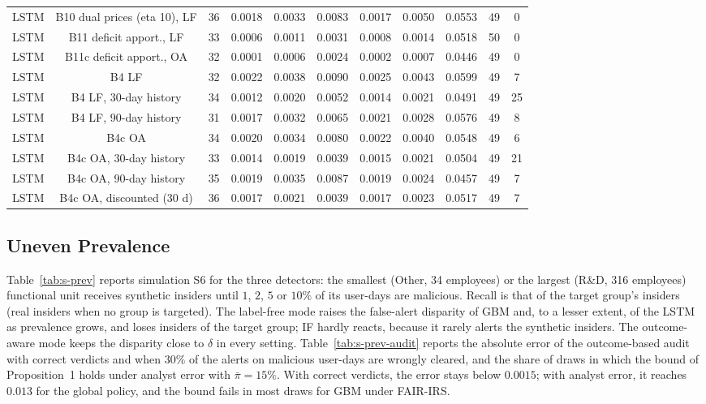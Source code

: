 \documentclass[10pt,onecolumn,letterpaper]{article}
\begin{document}
\begin{table}[!t]
{\begin{tabular}{lcccccccccc}
LSTM & B10 dual prices (eta 10), LF & 36 & 0.0018 & 0.0033 & 0.0083 & 0.0017 & 0.0050 & 0.0553 & 49 & 0 \\
LSTM & B11 deficit apport., LF & 33 & 0.0006 & 0.0011 & 0.0031 & 0.0008 & 0.0014 & 0.0518 & 50 & 0 \\
LSTM & B11c deficit apport., OA & 32 & 0.0001 & 0.0006 & 0.0024 & 0.0002 & 0.0007 & 0.0446 & 49 & 0 \\
LSTM & B4 LF & 32 & 0.0022 & 0.0038 & 0.0090 & 0.0025 & 0.0043 & 0.0599 & 49 & 7 \\
LSTM & B4 LF, 30-day history & 34 & 0.0012 & 0.0020 & 0.0052 & 0.0014 & 0.0021 & 0.0491 & 49 & 25 \\
LSTM & B4 LF, 90-day history & 31 & 0.0017 & 0.0032 & 0.0065 & 0.0021 & 0.0028 & 0.0576 & 49 & 8 \\
LSTM & B4c OA & 34 & 0.0020 & 0.0034 & 0.0080 & 0.0022 & 0.0040 & 0.0548 & 49 & 6 \\
LSTM & B4c OA, 30-day history & 33 & 0.0014 & 0.0019 & 0.0039 & 0.0015 & 0.0021 & 0.0504 & 49 & 21 \\
LSTM & B4c OA, 90-day history & 35 & 0.0019 & 0.0035 & 0.0087 & 0.0019 & 0.0024 & 0.0457 & 49 & 7 \\
LSTM & B4c OA, discounted (30 d) & 36 & 0.0017 & 0.0021 & 0.0039 & 0.0017 & 0.0023 & 0.0517 & 49 & 7 \\
\bottomrule
\end{tabular}}
\end{table}

\subsection{Uneven Prevalence}
Table~\ref{tab:s-prev} reports simulation S6 for the three detectors: the smallest (Other, 34 employees) or the largest (R\&D, 316 employees) functional unit receives synthetic insiders until $1$, $2$, $5$ or $10\%$ of its user-days are malicious. Recall is that of the target group's insiders (real insiders when no group is targeted). The label-free mode raises the false-alert disparity of GBM and, to a lesser extent, of the LSTM as prevalence grows, and loses insiders of the target group; IF hardly reacts, because it rarely alerts the synthetic insiders. The outcome-aware mode keeps the disparity close to $\delta$ in every setting. Table~\ref{tab:s-prev-audit} reports the absolute error of the outcome-based audit with correct verdicts and when $30\%$ of the alerts on malicious user-days are wrongly cleared, and the share of draws in which the bound of Proposition~1 holds under analyst error with $\bar\pi=15\%$. With correct verdicts, the error stays below $0.0015$; with analyst error, it reaches $0.013$ for the global policy, and the bound fails in most draws for GBM under FAIR-IRS.
\end{document}
